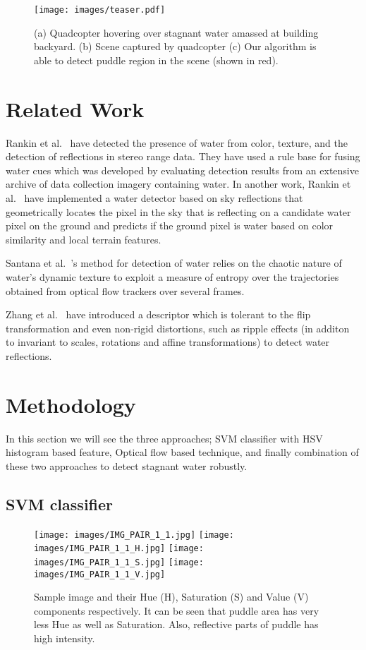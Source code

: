 \documentclass[times,10pt,twocolumn,letterpaper]{article}
\begin{document}
\begin{figure}[h!]
\centering
\texttt{[image: images/teaser.pdf]}
\caption{(a) Quadcopter hovering over stagnant water amassed at building
backyard. (b) Scene captured by quadcopter (c) Our algorithm is able to detect
puddle region in the scene (shown in red).}
\end{figure}

\section{Related Work}

Rankin et al.~\cite{rankin04} have detected the presence of water from color,
texture, and the detection of reflections in stereo range data. They have used a
rule base for fusing water cues which was developed by evaluating detection
results from an extensive archive of data collection imagery containing water.
In another work, Rankin et al.~\cite{rankin11} have implemented a water detector
based on sky reflections that geometrically locates the pixel in the sky that
is reflecting on a candidate water pixel on the ground and predicts if the
ground pixel is water based on color similarity and local terrain features. 

Santana et al.~\cite{santana12}'s method for detection of water relies on the
chaotic nature of water’s dynamic texture to exploit a measure of entropy over the
trajectories obtained from optical flow trackers over several frames.

Zhang et al.~\cite{zhang10} have introduced a descriptor which is tolerant
to the flip transformation and even non-rigid distortions, such as ripple
effects (in additon to invariant to scales, rotations and affine
transformations) to detect water reflections.

\section{Methodology}
In this section we will see the three approaches; SVM classifier with HSV
histogram based feature, Optical flow based technique, and finally combination
of these two approaches to detect stagnant water robustly.

\subsection{SVM classifier}

\begin{figure}[h!]
\centering
\texttt{[image: images/IMG\_PAIR\_1\_1.jpg]}
\texttt{[image: images/IMG\_PAIR\_1\_1\_H.jpg]}
\texttt{[image: images/IMG\_PAIR\_1\_1\_S.jpg]}
\texttt{[image: images/IMG\_PAIR\_1\_1\_V.jpg]}
\caption{Sample image and their Hue (H), Saturation (S) and Value (V) components
respectively. It can be seen that puddle area has very less Hue as well
as Saturation. Also, reflective parts of puddle has high intensity.}
\label{fig:HSV}
\end{figure}
\end{document}
